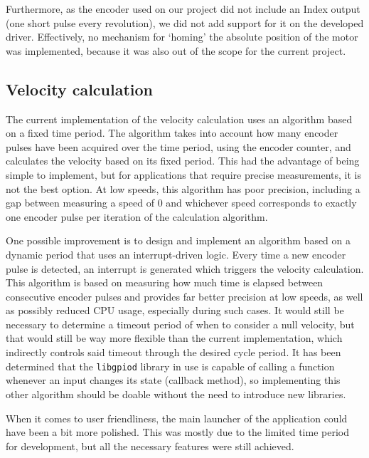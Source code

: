 Furthermore, as the encoder used on our project did not include an Index output (one short pulse every revolution), we did not add support for it on the developed driver.
Effectively, no mechanism for `homing' the absolute position of the motor was implemented, because it was also out of the scope for the current project.

\subsection{Velocity calculation}
The current implementation of the velocity calculation uses an algorithm based on a fixed time period.
The algorithm takes into account how many encoder pulses have been acquired over the time period, using the encoder counter, and calculates the velocity based on its fixed period.
This had the advantage of being simple to implement, but for applications that require precise measurements, it is not the best option.
At low speeds, this algorithm has poor precision, including a gap between measuring a speed of 0 and whichever speed corresponds to exactly one encoder pulse per iteration of the calculation algorithm.

One possible improvement is to design and implement an algorithm based on a dynamic period that uses an interrupt-driven logic.
Every time a new encoder pulse is detected, an interrupt is generated which triggers the velocity calculation.
This algorithm is based on measuring how much time is elapsed between consecutive encoder pulses and provides far better precision at low speeds, as well as possibly reduced CPU usage, especially during such cases.
It would still be necessary to determine a timeout period of when to consider a null velocity, but that would still be way more flexible than the current implementation, which indirectly controls said timeout through the desired cycle period.
It has been determined that the \verb|libgpiod| library in use is capable of calling a function whenever an input changes its state (callback method), so implementing this other algorithm should be doable without the need to introduce new libraries.

When it comes to user friendliness, the main launcher of the application could have been a bit more polished.
This was mostly due to the limited time period for development, but all the necessary features were still achieved.

